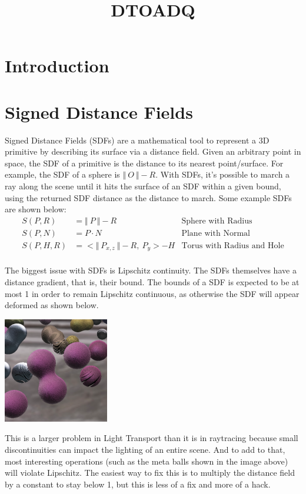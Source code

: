 \documentclass{article}
\title{DTOADQ}
\begin{document}
  \maketitle
  \section{Introduction}

  \section{Signed Distance Fields}
  Signed Distance Fields (SDFs) are a mathematical tool to represent a 3D primitive by describing its surface via a distance field. Given an arbitrary point in space, the SDF of a primitive is the distance to its nearest point/surface. For example, the SDF of a sphere is $\Vert\:O\:\Vert - R$. With SDFs, it's possible to march a ray along the scene until it hits the surface of an SDF within a given bound, using the returned SDF distance as the distance to march. Some example SDFs are shown below:    \begin{align*}
  S(P, R) &= \Vert\:P\:\Vert - R & \text{Sphere with Radius}\\
  S(P, N) &= P \cdot N  & \text{Plane with Normal}\\
  S(P, H, R) &= <\Vert\:P_{x, z}\:\Vert - R, \: P_{y}> - H & \text{Torus with Radius and Hole}\\
  \end{align*}
  
  The biggest issue with SDFs is Lipschitz continuity. The SDFs themselves have a distance gradient, that is, their bound. The bounds of a SDF is expected to be at most 1 in order to remain Lipschitz continuous, as otherwise the SDF will appear deformed as shown below.
  
  \includegraphics[]{lipschittzbound}
  
  This is a larger problem in Light Transport than it is in raytracing because small discontinuities can impact the lighting of an entire scene. And to add to that, most interesting operations (such as the meta balls shown in the image above) will violate Lipschitz. The easiest way to fix this is to multiply the distance field by a constant to stay below 1, but this is less of a fix and more of a hack.
  
\end{document}
